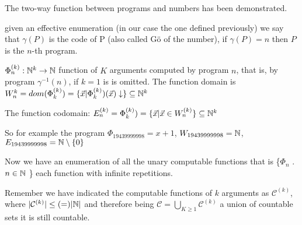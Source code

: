 The two-way function between programs and numbers has been demonstrated.

\begin{notation} given an effective enumeration (in our case the one
  defined previously) we say that $ \gamma(P) $ is the code of P (also
  called G\"{o} of the number), if $ \gamma(P) = n $ then $P$ is the
  $n$-th program.
\end{notation}

\begin{notation} $ \Phi_n^{(k)}: \mathbb{N}^k\rightarrow\mathbb{N} $ function of
  $K$ arguments computed by program $n$, that is, by program
  $ \gamma^{-1}(n) $, if $k = 1$ is is omitted. The function domain is
  $ W_n^{k} = dom(\Phi_k^{(k)}) = \{\vec{x} |
  \Phi_k^{(k)})(\vec{x})\downarrow \} \subseteq \mathbb{N}^k$

  The function codomain:
  $ E^{(k)}_n = \Phi_k^{(k)}) = \{\vec{x} | \vec{x} \in W_n^{(k)} \}
  \subseteq \mathbb{N}^k$
\end{notation}

So for example the program $ \Phi_{19439999998} = x+1 $,
$ W_{19439999998} = \mathbb{N} $, $ E_{19439999998} = \mathbb{N} \setminus \{0\} $

Now we have an enumeration of all the unary computable functions that is \{$ \Phi_n $ . $ n \in \mathbb{N} $ \} each function with infinite repetitions.

Remember we have indicated the computable functions of $k$ arguments as $ \mathcal{C} ^ {(k)} $, where $ | \mathcal{C} ^ {(k)} | \leq (=) | \mathbb{N} | $ and therefore being $ \mathcal{C} = \bigcup_{K \geq 1} \mathcal{C} ^ {(k)} $ a union of countable sets it is still countable.
